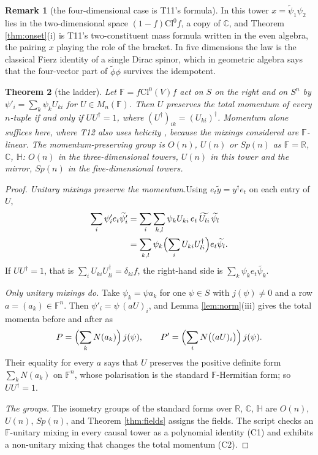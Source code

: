 \documentclass[11pt]{article}
\newtheorem{theorem}{Theorem}[section]
\theoremstyle{definition}
\newtheorem{remark}[theorem]{Remark}
\newcommand{\Cl}{\mathrm{Cl}}
\newcommand{\R}{\mathbb{R}}
\newcommand{\C}{\mathbb{C}}
\newcommand{\HH}{\mathbb{H}}
\newcommand{\F}{\mathbb{F}}
\newcommand{\rev}[1]{\widetilde{#1}}
\newcommand{\pstep}[1]{\par\smallskip\noindent\textit{#1.}\enspace}
\begin{document}
\begin{remark}[the four-dimensional case is T11's formula]\label{rem:T11}
In this tower $x = \rev{\psi}_{1}\psi_{2}$ lies in the two-dimensional space $(1-f)\Cl^{0}f$, a copy of $\C$, and Theorem \ref{thm:onset}(i) is T11's two-constituent mass formula \cite[Prop.~4.1]{ButlerT11} written in the even algebra, the pairing $x$ playing the role of the bracket. In five dimensions the law is the classical Fierz identity of a single Dirac spinor, which in geometric algebra says that the four-vector part of $\rev{\phi}\phi$ survives the idempotent.
\end{remark}

\begin{theorem}[the ladder]\label{thm:ladder}
Let $\F = f\Cl^{0}(V)f$ act on $S$ on the right and on $S^{n}$ by $\psi'_{i} = \sum_{k}\psi_{k}U_{ki}$ for $U \in M_{n}(\F)$. Then $U$ preserves the total momentum of every $n$-tuple if and only if $UU^{\dagger} = 1$, where $(U^{\dagger})_{ik} = (U_{ki})^{\dagger}$. Momentum alone suffices here, where T12 also uses helicity \cite[Prop.~3.1]{ButlerT12}, because the mixings considered are $\F$-linear. The momentum-preserving group is $O(n)$, $U(n)$ or $Sp(n)$ as $\F = \R$, $\C$, $\HH$: $O(n)$ in the three-dimensional towers, $U(n)$ in this tower and the mirror, $Sp(n)$ in the five-dimensional towers.
\end{theorem}

\begin{proof}
\textit{Unitary mixings preserve the momentum.}\enspace Using $e_{t}\rev{y} = y^{\dagger}e_{t}$ on each entry of $U$,
\begin{align*}
\sum_{i}\psi'_{i}e_{t}\rev{\psi'_{i}} &= \sum_{i}\sum_{k,l}\psi_{k}U_{ki}\,e_{t}\,\rev{U_{li}}\,\rev{\psi_{l}} \\
&= \sum_{k,l}\psi_{k}\Bigl(\sum_{i}U_{ki}U_{li}^{\dagger}\Bigr)e_{t}\rev{\psi_{l}}.
\end{align*}
If $UU^{\dagger} = 1$, that is $\sum_{i}U_{ki}U_{li}^{\dagger} = \delta_{kl}f$, the right-hand side is $\sum_{k}\psi_{k}e_{t}\rev{\psi_{k}}$.

\pstep{Only unitary mixings do} Take $\psi_{k} = \psi a_{k}$ for one $\psi \in S$ with $j(\psi) \neq 0$ and a row $a = (a_{k}) \in \F^{n}$. Then $\psi'_{i} = \psi\,(aU)_{i}$, and Lemma \ref{lem:norm}(iii) gives the total momenta before and after as
\[
P = \Bigl(\sum_{k}N(a_{k})\Bigr)\,j(\psi), \qquad P' = \Bigl(\sum_{i}N\bigl((aU)_{i}\bigr)\Bigr)\,j(\psi).
\]
Their equality for every $a$ says that $U$ preserves the positive definite form $\sum_{k}N(a_{k})$ on $\F^{n}$, whose polarisation is the standard $\F$-Hermitian form; so $UU^{\dagger} = 1$.

\pstep{The groups} The isometry groups of the standard forms over $\R$, $\C$, $\HH$ are $O(n)$, $U(n)$, $Sp(n)$, and Theorem \ref{thm:fields} assigns the fields. The script checks an $\F$-unitary mixing in every causal tower as a polynomial identity (C1) and exhibits a non-unitary mixing that changes the total momentum (C2).
\end{proof}
\end{document}
